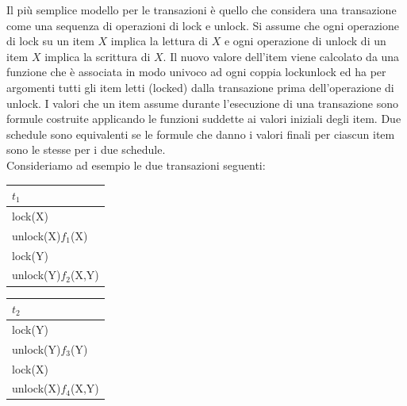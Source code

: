 Il più semplice modello per le transazioni è quello che considera una transazione come una
sequenza di operazioni di lock e unlock. Si assume che ogni operazione di lock su un item $X$ implica
la lettura di $X$ e ogni operazione di unlock di un item $X$ implica la scrittura di $X$. Il nuovo valore
dell'item viene calcolato da una funzione che è associata in modo univoco ad ogni coppia lockunlock
ed ha per argomenti tutti gli item letti (locked) dalla transazione prima dell'operazione di
unlock. I valori che un item assume durante l'esecuzione di una transazione sono formule costruite
applicando le funzioni suddette ai valori iniziali degli item. Due schedule sono equivalenti se le
formule che danno i valori finali per ciascun item sono le stesse per i due schedule.\\
Consideriamo ad esempio le due transazioni seguenti:

\begin{multicols}{2}  

 \begin{tabular}{|l|}
   \hline
   $t_1$\\
   \hline
   lock(X)\\ 
   unlock(X)$f_1$(X)\\ 
   lock(Y)\\ 
   unlock(Y)$f_2$(X,Y)\\ 
  \hline
 \end{tabular}
 
 \begin{tabular}{|l|}
  \hline
   $t_2$\\
   \hline
   lock(Y)\\
   unlock(Y)$f_3$(Y)\\
   lock(X)\\
   unlock(X)$f_4$(X,Y)\\
  \hline
  \end{tabular} 
 \end{multicols}

